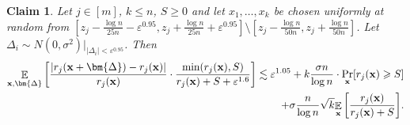 \documentclass[10pt,a4paper]{article}
\newtheorem{claim}[thm]{Claim}
\newcommand\E{\mathop{\mathbb{E}}}
\newcommand\Expect[2]{{\mathop{\mathbb{E}}_{#1}\left[ {#2} \right]}}
\newcommand\eps{\varepsilon}
\renewcommand\geq{\geqslant}
\renewcommand\ge{\geqslant}
\renewcommand\leq{\leqslant}
\newcommand{\De}{\Delta}
\newcommand{\ve}{\varepsilon}
\def\ll{\lesssim}
\begin{document}
\begin{claim}\label{cl:A-5}
Let $j\in [m]$, $k\leq n$, $S\geq 0$ and let $x_1,\ldots,x_k$
be chosen uniformly at random from
$[z_j-\frac{\log n}{25 n}-\eps^{0.95},z_j+\frac{\log n}{25 n}+\eps^{0.95}] \setminus [z_j-\frac{\log n}{50 n},z_j+\frac{\log n}{50 n}]$.
Let $\De_i \sim N(0,\sigma^2)|_{|\De_i|<\ve^{0.95}}$.
Then
\begin{align*}
\E_{{\bf x},\bm{\De}} \left[ \frac{|r_j({\bf x}+\bm{\De})-r_j({\bf x})|}{r_j({\bf x})}\cdot \frac{\min(r_j({\bf x}),S)}
 {r_j({\bf x})+S+\ve^{1.6}}\right]
\ll  \ve^{1.05}+ k\frac{\sigma n}{\log n}  \cdot \Pr_{{\bf x}}[r_j({\bf x})\ge S]\\
+\sigma \frac{n}{\log n}\sqrt{k} \Expect{{\bf x}}{\frac{r_j({\bf x})}{r_j({\bf x})+S}}.
\end{align*}
\end{claim}
\end{document}
